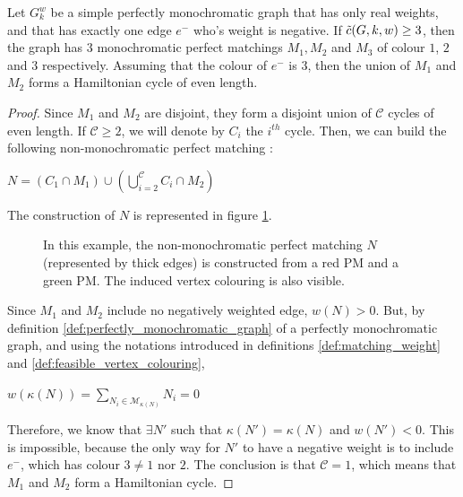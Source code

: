 \begin{observation}
    \label{obs:one_neg_edge_ham_cycle}
    Let $G_k^w$ be a simple perfectly monochromatic graph that has only real weights, and that has exactly one edge $e^-$ who's weight is negative. If $\Tilde{c}(G, k, w) \geq 3$, then the graph has $3$ monochromatic perfect matchings $M_1, M_2$ and $M_3$ of colour $1$, $2$ and $3$ respectively. Assuming that the colour of $e^-$ is $3$, then the union of $M_1$ and $M_2$ forms a Hamiltonian cycle of even length.
\end{observation}

\begin{proof}
    Since $M_1$ and $M_2$ are disjoint, they form a disjoint union of $\mathcal{C}$ cycles of even length. If $\mathcal{C} \geq 2$, we will denote by $C_i$ the $i^{th}$ cycle. Then, we can build the following non-monochromatic perfect matching :

    \begin{center}
        $N = (C_1 \cap M_1) \cup (\bigcup\limits_{i=2}^{\mathcal{C}} C_i \cap M_2)$
    \end{center}

    The construction of $N$ is represented in figure \ref{fig:proof_unique_neg_ham}.

    \begin{figure}[H]
        \caption{In this example, the non-monochromatic perfect matching $N$ (represented by thick edges) is constructed from a red PM and a green PM. The induced vertex colouring is also visible.}
        \label{fig:proof_unique_neg_ham}
    \end{figure}

    Since $M_1$ and $M_2$ include no negatively weighted edge, $w(N) > 0$. But, by definition \ref{def:perfectly_monochromatic_graph} of a perfectly monochromatic graph, and using the notations introduced in definitions \ref{def:matching_weight} and \ref{def:feasible_vertex_colouring},

    \begin{center}
        $w(\kappa(N)) = \sum\limits_{N_i \in \mathcal{M}_{\kappa(N)}} N_i = 0$
    \end{center}

    Therefore, we know that $\exists N'$ such that $\kappa(N') = \kappa(N)$ and $w(N') < 0$. This is impossible, because the only way for $N'$ to have a negative weight is to include $e^-$, which has colour $3 \neq 1$ nor $2$. The conclusion is that $\mathcal{C} = 1$, which means that $M_1$ and $M_2$ form a Hamiltonian cycle.
\end{proof}


